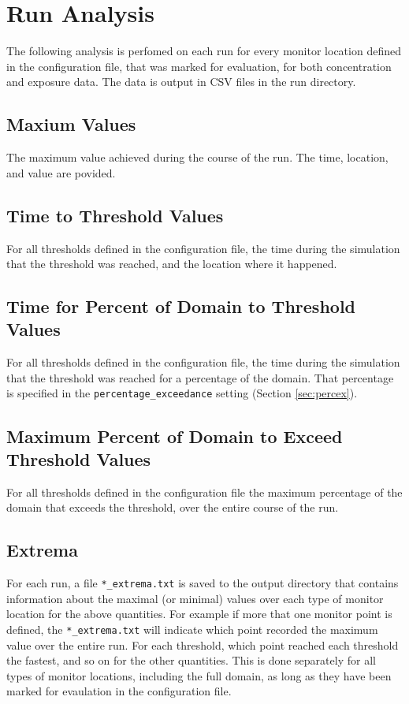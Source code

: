\documentclass[]{article}
\def\code#1{\texttt{#1}}
\begin{document}
\section{Run Analysis}\label{sec:analysis}
The following analysis is perfomed on each run for every monitor location
defined in the configuration file, that was marked for evaluation, for both
concentration and exposure data. The data is output in CSV files in the run
directory.
\subsection{Maxium Values}
The maximum value achieved during the course of the run. The time, location, and
value are povided.

\subsection{Time to Threshold Values}
For all thresholds defined in the configuration file, the time during the
simulation that the threshold was reached, and the location where it happened.

\subsection{Time for Percent of Domain to Threshold Values}
For all thresholds defined in the configuration file, the time during the
simulation that the threshold was reached for a percentage of the domain. That
percentage is specified in the
\code{percentage\_exceedance} setting (Section
\ref{sec:percex}).

\subsection{Maximum Percent of Domain to Exceed Threshold Values}
For all thresholds defined in the configuration file the maximum percentage of
the domain that exceeds the threshold, over the entire course of the run.\\

\subsection{Extrema}
\noindent For each run, a file \code{*\_extrema.txt} is saved to the output directory that
contains information about the maximal (or minimal) values over each type of
monitor location for the above quantities. For example if more that one monitor
point is defined, the \code{*\_extrema.txt} will indicate which point recorded
the maximum value over the entire run. For each threshold, which point reached
each threshold the fastest, and so on for the other quantities. This is done
separately for all types of monitor locations, including the full domain, as
long as they have been marked for evaulation in the configuration file.
\end{document}
